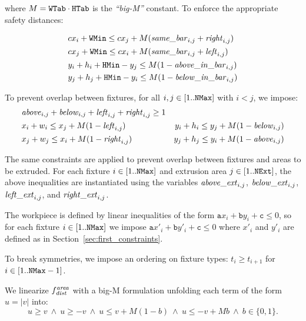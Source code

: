 \noindent where $M = \mathtt{WTab} \cdot \mathtt{HTab}$ is the \emph{``big-M''} constant. To enforce the appropriate safety distances:

\[
\begin{aligned}
	&cx_i + \mathtt{WMin} \le cx_j + M(\mathit{same\_bar}_{i,j} + \mathit{right}_{i,j}) \\
	&cx_j + \mathtt{WMin} \le cx_i + M(\mathit{same\_bar}_{i,j} + \mathit{left}_{i,j}) \\
	&y_i + h_i + \mathtt{HMin} - y_j \le M (1 - \mathit{above\_in\_bar}_{i,j}) \\
	&y_j + h_j + \mathtt{HMin} - y_i \le M (1 - \mathit{below\_in\_bar}_{i,j})
\end{aligned}
\]

To prevent overlap between fixtures, for all $i,j \in [1..\mathtt{NMax}]$ with $i < j$, we impose:
\[
\begin{aligned}
	&\mathit{above}_{i,j} + \mathit{below}_{i,j} +
	\mathit{left}_{i,j} + \mathit{right}_{i,j} \ge 1 \\
	&x_i + w_i \le x_j + M (1 - \mathit{left}_{i,j}) \qquad
	&y_i + h_i \le y_j + M (1 - \mathit{below}_{i,j}) \\
	&x_j + w_j \le x_i + M (1 - \mathit{right}_{i,j}) \qquad
	&y_j + h_j \le y_i + M (1 - \mathit{above}_{i,j})
\end{aligned}
\]

The same constraints are applied to prevent overlap between fixtures and areas to be extruded. For each fixture $i \in [1..\mathtt{NMax}]$ and extrusion area $j \in [1..\mathtt{NExt}]$, the above inequalities are instantiated using the variables $\mathit{above\_ext}_{i,j}$, $\mathit{below\_ext}_{i,j}$, $\mathit{left\_ext}_{i,j}$, and $\mathit{right\_ext}_{i,j}$.

The workpiece is defined by linear inequalities of the form $\mathtt{a}x_i + \mathtt{b}y_i + \mathtt{c} \leq 0$, so for each fixture $i \in [1..\mathtt{NMax}]$ we impose
$\mathtt{a}x'_i + \mathtt{b}y'_i + \mathtt{c} \leq 0$ where $x'_i$ and $y'_i$ are defined as in Section~\ref{sec:first_constraints}.

To break symmetries, we impose an ordering on fixture types: $t_i \ge t_{i+1}$ for $i \in [1..\mathtt{NMax}-1]$.

\noindent We linearize $f_{\mathit{dist}}^{\mathit{area}}$ with a big-M formulation unfolding each term of the form $u=|v|$ into: $$u \ge v ~\wedge~ u \ge -v ~\wedge~ u \leq v + M (1 - b)  ~\wedge~ u \leq -v + M b~\wedge~ b\in\{0,1\}.$$

